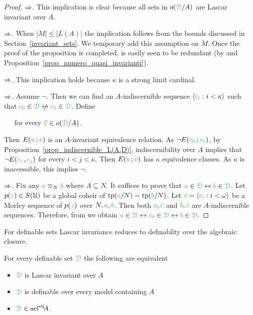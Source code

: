 \begin{proof}
  $\Rightarrow$. This implication is clear because all sets in $o({\color{green}\EuScript D}/A)$ are Lascar invariant over $A$. 
  
  $\Rightarrow$. When $|M|\le|L(A)|$ the implication follows from the bounds discussed in Section~\ref{invariant_sets}.
  We temporary add this assumption on $M$.
  Once the proof of the proposition is completed, is easily seen to be redundant (by  and Proposition~\ref{prop_numero_quasi_invarianti}). 
  
  $\Rightarrow$. This implication holds because $\kappa$ is a strong limit cardinal.

  $\Rightarrow$. Assume $\neg$.
  Then we can find an $A\mbox{-}$indiscernible sequence $\langle{\color{green}c_i}:i<\kappa\rangle$ such that ${\gr c_0}\in\grD\niff {\gr c_1}\in\grD$.
  Define

  \ \ \ for every ${\color{green}\EuScript C}\in o({\color{green}\EuScript D}/A)$.

  Then $E({\color{green} u}\,;{\color{green} v})$ is an $A\mbox{-}$invariant equivalence relation.
  As $\neg E({\color{green} c_0}\,;{\color{green} c_1})$, by Proposition~\ref{prop_indiscernible_L(A,D)}, indiscernibility over $A$ implies that $\neg E({\color{green} c_i\,},{\color{green} c_j})$ for every $i<j<\kappa$.
  Then $E({\color{green} u}\,;{\color{green} v})$ has $\kappa$ equivalence classes.
  As $\kappa$ is inaccessible, this implies $\neg$.

  $\Rightarrow$. Fix any ${\color{green} a}\equiv_N{\color{green} b}$ where $A\subseteq N$.
  It suffices to prove that ${\color{green} a}\in{\color{green}\EuScript D}\leftrightarrow{\color{green}b}\in{\color{green}\EuScript D}$.
  Let $p({\color{green} z})\in S(\EuScript U)$ be a global coheir of ${\rm tp}({\color{green} a}/N)={\rm tp}({\color{green} b}/N)$.
  Let ${\color{green}\bar c}=\langle{\color{green}c_i}:i<\omega\rangle$ be a Morley sequence of $p({\color{green} z})$ over $N,{\color{green} a},{\color{green} b}$.
  Then both ${\color{green} a},{\color{green}\bar c}$ and ${\color{green} b},{\color{green}\bar c}$ are $A\mbox{-}$indiscernible sequences.
  Therefore, from  we obtain ${\color{green} a}\in{\color{green}\EuScript D}\leftrightarrow{\color{green}c_0}\in{\color{green}\EuScript D}\leftrightarrow{\color{green}b}\in{\color{green}\EuScript D}$. 
\end{proof}

For definable sets Lascar invariance reduces to definablity over the algebraic closure.

\begin{corollary}\label{coroll_defble_Lascar_inv}
For every definable set ${\color{green}\EuScript D}$ the following are equivalent
\begin{itemize}
  \item[1.] ${\color{green}\EuScript D}$ is Lascar invariant over $A$
  \item[2.] ${\color{green}\EuScript D}$ is definable over every model containing $A$
  \item[3.] ${\color{green}\EuScript D}\in{\rm acl}^{{\rm eq}}\!A$.
\end{itemize}\smallskip
\end{corollary}

